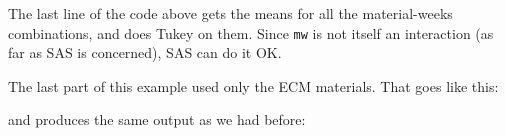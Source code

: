 \documentclass{article}
\begin{document}
The last line of the code above gets the means for all the
material-weeks combinations, and does Tukey on them. Since \texttt{mw}
is not itself an interaction (as far as SAS is concerned), SAS can do
it OK.

The last part of this example used only the ECM materials. That goes
like this:


and produces the same output as we had before:
\end{document}
